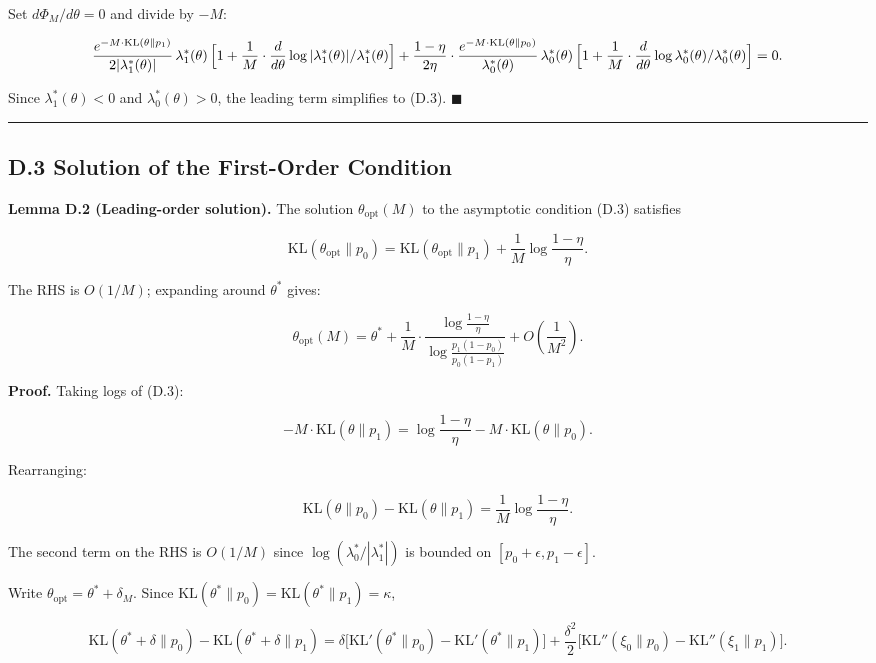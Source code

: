 \documentclass[
  12pt,
]{ctexart}
\begin{document}
Set \(d\Phi_M/d\theta = 0\) and divide by \(-M\):

\[
\frac{e^{-M\cdot\text{KL}(\theta\|p_1)}}{2|\lambda_1^*(\theta)|}\,
\lambda_1^*(\theta)\,
\Bigl[1 + \frac{1}{M}\cdot\frac{d}{d\theta}\log|\lambda_1^*(\theta)|/\lambda_1^*(\theta)\Bigr]
+ \frac{1-\eta}{2\eta}\cdot\frac{e^{-M\cdot\text{KL}(\theta\|p_0)}}{\lambda_0^*(\theta)}\,
\lambda_0^*(\theta)\,
\Bigl[1 + \frac{1}{M}\cdot\frac{d}{d\theta}\log\lambda_0^*(\theta)/\lambda_0^*(\theta)\Bigr]
= 0.
\]

Since \(\lambda_1^*(\theta) < 0\) and \(\lambda_0^*(\theta) > 0\), the
leading term simplifies to (D.3). \(\blacksquare\)

\begin{center}\rule{0.5\linewidth}{0.5pt}\end{center}

\subsection{D.3 Solution of the First-Order
Condition}\label{d.3-solution-of-the-first-order-condition}

\textbf{Lemma D.2 (Leading-order solution).} The solution
\(\theta_{\text{opt}}(M)\) to the asymptotic condition (D.3) satisfies

\[
\text{KL}(\theta_{\text{opt}}\|p_0) = \text{KL}(\theta_{\text{opt}}\|p_1)
+ \frac{1}{M}\log\frac{1-\eta}{\eta}. \tag{D.4}
\]

The RHS is \(O(1/M)\); expanding around \(\theta^*\) gives:

\[
\theta_{\text{opt}}(M) = \theta^* + \frac{1}{M}\cdot\frac{\log\frac{1-\eta}{\eta}}{\log\frac{p_1(1-p_0)}{p_0(1-p_1)}} + O\!\left(\frac{1}{M^2}\right). \tag{D.5}
\]

\textbf{Proof.} Taking logs of (D.3):

\[
-M\cdot\text{KL}(\theta\|p_1) = \log\frac{1-\eta}{\eta} - M\cdot\text{KL}(\theta\|p_0).
\]

Rearranging:

\[
\text{KL}(\theta\|p_0) - \text{KL}(\theta\|p_1) = \frac{1}{M}\log\frac{1-\eta}{\eta}. \tag{D.6}
\]

The second term on the RHS is \(O(1/M)\) since
\(\log(\lambda_0^*/|\lambda_1^*|)\) is bounded on
\([p_0+\epsilon, p_1-\epsilon]\).

Write \(\theta_{\text{opt}} = \theta^* + \delta_M\). Since
\(\text{KL}(\theta^*\|p_0) = \text{KL}(\theta^*\|p_1) = \kappa\),

\[
\text{KL}(\theta^*+\delta\|p_0) - \text{KL}(\theta^*+\delta\|p_1)
= \delta\bigl[\text{KL}'(\theta^*\|p_0) - \text{KL}'(\theta^*\|p_1)\bigr] + \frac{\delta^2}{2}\bigl[\text{KL}''(\xi_0\|p_0) - \text{KL}''(\xi_1\|p_1)\bigr].
\]
\end{document}
